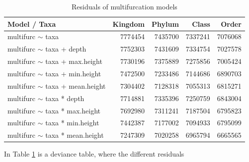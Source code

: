       \begin{table}[h!]
        \begin{center}
            \begin{tabular}{ |l|r|r|r|r| }
              \hline
              Model / Taxa & Kingdom & Phylum & Class & Order \\
              \hline \hline
              multifurc $\sim$ taxa & 7774454 & \cellcolor{green!10}7435700 & \cellcolor{green!15}7337241 & \cellcolor{green!30}7076068 \\
              \hline
              multifurc $\sim$ taxa + depth & 7752303 & \cellcolor{green!10}7431609 & \cellcolor{green!15}7334754 & \cellcolor{green!30}7027578 \\
              multifurc $\sim$ taxa + max.height & 7730196 & \cellcolor{green!15}7375889 & \cellcolor{green!20}7275856 & \cellcolor{green!30}7005424 \\
              multifurc $\sim$ taxa + min.height & \cellcolor{green!10}7472500 & \cellcolor{green!20}7233486 & \cellcolor{green!25}7144686 & \cellcolor{green!40}6890703 \\
              multifurc $\sim$ taxa + mean.height & \cellcolor{green!15}7304402 & \cellcolor{green!25}7128318 & \cellcolor{green!30}7055313 & \cellcolor{green!40}6815271 \\
              \hline
              multifurc $\sim$ taxa * depth & 7714881 & \cellcolor{green!15}7335396 & \cellcolor{green!20}7250759 & \cellcolor{green!40}6843004 \\
              multifurc $\sim$ taxa * max.height & \cellcolor{green!5}7692980 & \cellcolor{green!15}7311241 & \cellcolor{green!25}7187504 & \cellcolor{green!45}6795823 \\
              multifurc $\sim$ taxa * min.height & \cellcolor{green!10}7442387 & \cellcolor{green!25}7177002 & \cellcolor{green!30}7094933 & \cellcolor{green!45}6795099 \\
              multifurc $\sim$ taxa * mean.height & \cellcolor{green!20}7247309 & \cellcolor{green!30}7020258 & \cellcolor{green!35}6965794 & \cellcolor{green!50}6665565 \\
              \hline
            \end{tabular}
        \end{center}
        \caption{Residuals of multifurcation models}
        \label{table:Residuals multifurcation} 
      \end{table}
      In Table \ref{table:Residuals multifurcation} is a deviance table, where the different residuals 
